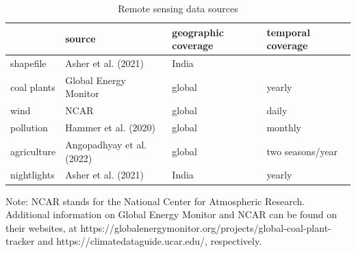 \documentclass[
]{article}
\begin{document}
\begin{table}[H]

\caption{\label{tab:data}Remote sensing data sources}
\centering
\begin{threeparttable}
\begin{tabular}[t]{>{\raggedright\arraybackslash}p{2cm}>{\centering\arraybackslash}p{4.5cm}>{\centering\arraybackslash}p{3.5cm}>{\centering\arraybackslash}p{3.5cm}}
\toprule
  & source & geographic coverage & temporal coverage\\
\midrule
shapefile & Asher et al. (2021) & India & \\
coal plants & Global Energy Monitor & global & yearly\\
wind & NCAR & global & daily\\
pollution & Hammer et al. (2020) & global & monthly\\
agriculture & Angopadhyay et al. (2022) & global & two seasons/year\\
nightlights & Asher et al. (2021) & India & yearly\\
\bottomrule
\end{tabular}
\begin{tablenotes}
\item Note: NCAR stands for the National Center for Atmospheric Research. Additional information on Global Energy Monitor and NCAR can be found on their websites, at https://globalenergymonitor.org/projects/global-coal-plant-tracker and https://climatedataguide.ucar.edu/, respectively.
\end{tablenotes}
\end{threeparttable}
\end{table}
\end{document}

